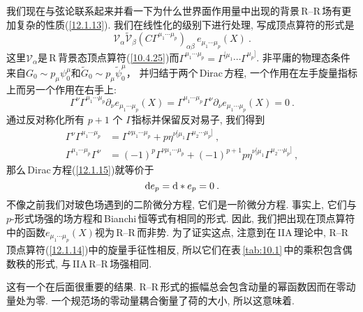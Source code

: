 我们现在与弦论联系起来并看一下为什么世界面作用量中出现的背景\,R--R\,场有更加复杂的性质(\ref{12.1.13}). 我们在线性化的级别下进行处理, 写成顶点算符的形式是
\begin{equation}
    \mathscr{V}_{\alpha}\tilde{\mathscr{V}}_{\beta}(C\Gamma^{\mu_{1}\cdots\mu_{p}})_{\alpha\beta}\,e_{\mu_{1}\cdots\mu_{p}}(X) \:. \label{12.1.14}
\end{equation}
这里$ \mathscr{V}_{\alpha} $是\,R\,背景态顶点算符(\ref{10.4.25})而$ \Gamma^{\mu_{1}\cdots\mu_{p}}=\Gamma^{[\mu_{1}}\cdots\Gamma^{\mu_{p}]}$. 非平庸的物理态条件来自$ G_{0}\sim p_{\mu}\psi_{0}^{\mu} $和$ \tilde{G}_{0}\sim p_{\mu}\tilde{\psi}_{0}^{\mu}$， 并归结于两个\,Dirac\,方程, 一个作用在左手旋量指标上而另一个作用在右手上:
\begin{equation}
    \Gamma^{\nu}\Gamma^{\mu_{1}\cdots\mu_{p}}\partial_{\nu}e_{\mu_{1}\cdots \mu_{p}}(X)=
    \Gamma^{\mu_{1}\cdots\mu_{p}}\Gamma^{\nu}\partial_{\nu}e_{\mu_{1}\cdots \mu_{p}}(X)=0\:.\label{12.1.15}
\end{equation}
通过反对称化所有 $p+1$ 个 $\Gamma $指标并保留反对易子, 我们得到
\begin{subequations}
    \begin{align}
        \Gamma^{\nu}\Gamma^{\mu_{1}\cdots\mu_{p}}&=\Gamma^{\nu\mu_{1}\cdots\mu_{p}}+p\eta^{\nu[\mu_{1}}\Gamma^{\mu_{2}\cdots\mu_{p}]}\:, \label{12.1.16a} \\  
        \Gamma^{\mu_{1}\cdots\mu_{p}}\Gamma^{\nu}&=(-1)^{p}\Gamma^{\nu\mu_{1}\cdots\mu_{p}}+(-1)^{p+1}p\eta^{\nu[\mu_{1}}\Gamma^{\mu_{2}\cdots\mu_{p}]}\:, \label{12.1.16b} 
    \end{align} \label{12.1.16}
\end{subequations}
那么\,Dirac\,方程(\ref{12.1.15})就等价于
\begin{equation}
    \mathrm{d} e_{p} = \mathrm{d}\ast e_{p}=0 \:. \label{12.1.17}
\end{equation}
不像之前我们对玻色场遇到的二阶微分方程, 它们是一阶微分方程. 事实上, 它们与$ p $-形式场强的场方程和\,Bianchi\,恒等式有相同的形式. 因此, 我们把出现在顶点算符中的函数$ e_{\mu_{1}\cdots \mu_{p}}(X) $视为\,R--R\,{}而非势. 为了证实这点, 注意到在\,IIA\,理论中, R--R\,顶点算符(\ref{12.1.14})中的旋量手征性相反, 所以它们在表\,\ref{tab:10.1}\,中的乘积包含偶数秩的形式, 与\,IIA\,R--R\,场强相同.

这有一个在后面很重要的结果. R--R\,形式的振幅总会包含动量的幂函数因而在零动量处为零. 一个规范场的零动量耦合衡量了荷的大小, 所以这意味着{}.

